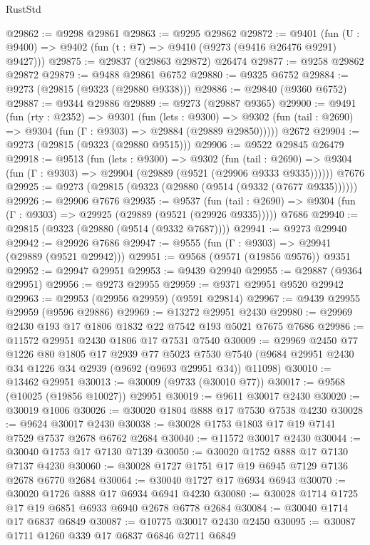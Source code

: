 \begin{lexlean}{RustStd}
\begin{coremodule}
@29862 := @9298 @29861
@29863 := @9295 @29862
@29872 := @9401
    (fun (U : @9400) => @9402 (fun (t : @7) => @9410 (@9273 (@9416 @26476 @9291) @9427)))
@29875 := @29837 (@29863 @29872) @26474
@29877 := @9258 @29862 @29872
@29879 := @9488 @29861 @6752
@29880 := @9325 @6752
@29884 := @9273 (@29815 (@9323 (@29880 @9338)))
@29886 := @29840 (@9360 @6752)
@29887 := @9344 @29886
@29889 := @9273 (@29887 @9365)
@29900 := @9491
    (fun (rty : @2352) =>
    @9301
      (fun (lets : @9300) =>
      @9302 (fun (tail : @2690) => @9304 (fun (Γ : @9303) => @29884 (@29889 @29850)))))
    @2672
@29904 := @9273 (@29815 (@9323 (@29880 @9515)))
@29906 := @9522 @29845 @26479
@29918 := @9513
    (fun (lets : @9300) =>
    @9302
      (fun (tail : @2690) =>
      @9304 (fun (Γ : @9303) => @29904 (@29889 (@9521 (@29906 @9333 @9335))))))
    @7676
@29925 := @9273 (@29815 (@9323 (@29880 (@9514 (@9332 (@7677 @9335))))))
@29926 := @29906 @7676
@29935 := @9537
    (fun (tail : @2690) => @9304 (fun (Γ : @9303) => @29925 (@29889 (@9521 (@29926 @9335)))))
    @7686
@29940 := @29815 (@9323 (@29880 (@9514 (@9332 @7687))))
@29941 := @9273 @29940
@29942 := @29926 @7686
@29947 := @9555 (fun (Γ : @9303) => @29941 (@29889 (@9521 @29942)))
@29951 := @9568 (@9571 (@19856 @9576)) @9351
@29952 := @29947 @29951
@29953 := @9439 @29940
@29955 := @29887 (@9364 @29951)
@29956 := @9273 @29955
@29959 := @9371 @29951 @9520 @29942
@29963 := @29953 (@29956 @29959) (@9591 @29814)
@29967 := @9439 @29955 @29959 (@9596 @29886)
@29969 := @13272 @29951 @2430
@29980 := @29969 @2430 @193 @17 @1806 @1832 @22 @7542 @193 @5021 @7675 @7686
@29986 := @11572 @29951 @2430 @1806 @17 @7531 @7540
@30009 := @29969
    @2450
    @77
    @1226
    @80
    @1805
    @17
    @2939
    @77
    @5023
    @7530
    @7540
    (@9684 @29951 @2430 @34 @1226 @34 @2939 (@9692 (@9693 @29951 @34)) @11098)
@30010 := @13462 @29951
@30013 := @30009 (@9733 (@30010 @77))
@30017 := @9568 (@10025 (@19856 @10027)) @29951
@30019 := @9611 @30017 @2430
@30020 := @30019 @1006
@30026 := @30020 @1804 @888 @17 @7530 @7538 @4230
@30028 := @9624 @30017 @2430
@30038 := @30028 @1753 @1803 @17 @19 @7141 @7529 @7537 @2678 @6762 @2684
@30040 := @11572 @30017 @2430
@30044 := @30040 @1753 @17 @7130 @7139
@30050 := @30020 @1752 @888 @17 @7130 @7137 @4230
@30060 := @30028 @1727 @1751 @17 @19 @6945 @7129 @7136 @2678 @6770 @2684
@30064 := @30040 @1727 @17 @6934 @6943
@30070 := @30020 @1726 @888 @17 @6934 @6941 @4230
@30080 := @30028 @1714 @1725 @17 @19 @6851 @6933 @6940 @2678 @6778 @2684
@30084 := @30040 @1714 @17 @6837 @6849
@30087 := @10775 @30017 @2430 @2450
@30095 := @30087 @1711 @1260 @339 @17 @6837 @6846 @2711 @6849

\end{coremodule}
\end{lexlean}
